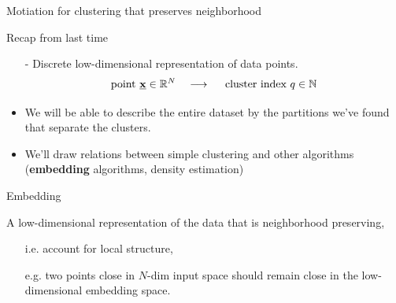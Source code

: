 \begin{frame}{Motiation for clustering that preserves neighborhood}

Recap from last time\\

 
\begin{itemize}
\item[-] Discrete low-dimensional representation of data points.
\begin{equation}
\text{point}~\underline{\mathbf{x}} \in \mathbb{R}^N \quad \longrightarrow \quad~\text{cluster index}~q \in \mathbb{N}
\end{equation} 
\item We will be able to describe the entire dataset by the partitions we've found that separate the clusters.
\item We'll draw relations between simple clustering and other algorithms (\textbf{embedding} algorithms, density estimation)
\end{itemize}

\end{frame}

\begin{frame}

\begin{block}{Embedding}

A low-dimensional representation of the data that is neighborhood preserving,
\begin{itemize}
\item[i.e.] account for local structure,
\item[e.g.] two points close in $N$-dim input space should remain close in the low-dimensional embedding space.
\end{itemize}

\end{block}

\end{frame}

